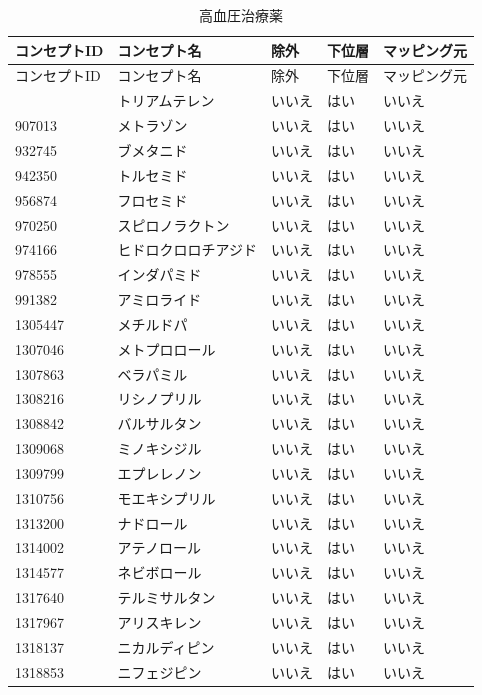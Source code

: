 \documentclass[
  11pt]{book}
\theoremstyle{definition}
\theoremstyle{definition}
\theoremstyle{definition}
\theoremstyle{definition}
\theoremstyle{remark}
\begin{document}
\begin{longtable}[]{@{}lllll@{}}
\caption{\label{tab:htnDrugsThzMono} 高血圧治療薬}\tabularnewline
\toprule\noalign{}
コンセプトID & コンセプト名 & 除外 & 下位層 & マッピング元 \\
\midrule\noalign{}
\endfirsthead
\toprule\noalign{}
コンセプトID & コンセプト名 & 除外 & 下位層 & マッピング元 \\
\midrule\noalign{}
\endhead
\bottomrule\noalign{}
\endlastfoot
904542 & トリアムテレン & いいえ & はい & いいえ \\
907013 & メトラゾン & いいえ & はい & いいえ \\
932745 & ブメタニド & いいえ & はい & いいえ \\
942350 & トルセミド & いいえ & はい & いいえ \\
956874 & フロセミド & いいえ & はい & いいえ \\
970250 & スピロノラクトン & いいえ & はい & いいえ \\
974166 & ヒドロクロロチアジド & いいえ & はい & いいえ \\
978555 & インダパミド & いいえ & はい & いいえ \\
991382 & アミロライド & いいえ & はい & いいえ \\
1305447 & メチルドパ & いいえ & はい & いいえ \\
1307046 & メトプロロール & いいえ & はい & いいえ \\
1307863 & ベラパミル & いいえ & はい & いいえ \\
1308216 & リシノプリル & いいえ & はい & いいえ \\
1308842 & バルサルタン & いいえ & はい & いいえ \\
1309068 & ミノキシジル & いいえ & はい & いいえ \\
1309799 & エプレレノン & いいえ & はい & いいえ \\
1310756 & モエキシプリル & いいえ & はい & いいえ \\
1313200 & ナドロール & いいえ & はい & いいえ \\
1314002 & アテノロール & いいえ & はい & いいえ \\
1314577 & ネビボロール & いいえ & はい & いいえ \\
1317640 & テルミサルタン & いいえ & はい & いいえ \\
1317967 & アリスキレン & いいえ & はい & いいえ \\
1318137 & ニカルディピン & いいえ & はい & いいえ \\
1318853 & ニフェジピン & いいえ & はい & いいえ \\

\end{longtable}
\end{document}
